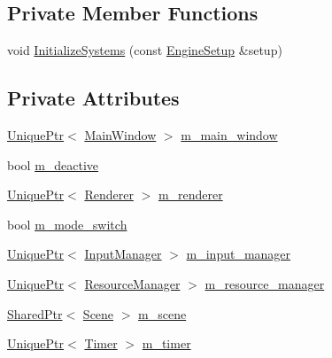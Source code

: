 \subsection*{Private Member Functions}
\begin{DoxyCompactItemize}
\item 
void \hyperlink{classmage_1_1_engine_a29a47448fb182b110d46d287a72b8b4e}{Initialize\+Systems} (const \hyperlink{structmage_1_1_engine_setup}{Engine\+Setup} \&setup)
\end{DoxyCompactItemize}
\subsection*{Private Attributes}
\begin{DoxyCompactItemize}
\item 
\hyperlink{namespacemage_a8c307fbcc33bce9b7f2aa4c26c3b95cf}{Unique\+Ptr}$<$ \hyperlink{classmage_1_1_main_window}{Main\+Window} $>$ \hyperlink{classmage_1_1_engine_a3aea7e8c0c1247cac570334a3d3543d6}{m\+\_\+main\+\_\+window}
\item 
bool \hyperlink{classmage_1_1_engine_ab8a4b0157403708ae7d1d018a95b4c63}{m\+\_\+deactive}
\item 
\hyperlink{namespacemage_a8c307fbcc33bce9b7f2aa4c26c3b95cf}{Unique\+Ptr}$<$ \hyperlink{classmage_1_1_renderer}{Renderer} $>$ \hyperlink{classmage_1_1_engine_a1248b7c21bc8256c72d372c12ed1ee68}{m\+\_\+renderer}
\item 
bool \hyperlink{classmage_1_1_engine_aa5cb2e0b7bb2c4a9020e79ab832ee221}{m\+\_\+mode\+\_\+switch}
\item 
\hyperlink{namespacemage_a8c307fbcc33bce9b7f2aa4c26c3b95cf}{Unique\+Ptr}$<$ \hyperlink{classmage_1_1_input_manager}{Input\+Manager} $>$ \hyperlink{classmage_1_1_engine_a8e9048208a6a5c5b034aaa1cbdab28bc}{m\+\_\+input\+\_\+manager}
\item 
\hyperlink{namespacemage_a8c307fbcc33bce9b7f2aa4c26c3b95cf}{Unique\+Ptr}$<$ \hyperlink{classmage_1_1_resource_manager}{Resource\+Manager} $>$ \hyperlink{classmage_1_1_engine_ac8d94579e72983a99a78be6b9b606a28}{m\+\_\+resource\+\_\+manager}
\item 
\hyperlink{namespacemage_a1e01ae66713838a7a67d30e44c67703e}{Shared\+Ptr}$<$ \hyperlink{classmage_1_1_scene}{Scene} $>$ \hyperlink{classmage_1_1_engine_a82158ab9c1b60538ef8c46d5eb263bb8}{m\+\_\+scene}
\item 
\hyperlink{namespacemage_a8c307fbcc33bce9b7f2aa4c26c3b95cf}{Unique\+Ptr}$<$ \hyperlink{classmage_1_1_timer}{Timer} $>$ \hyperlink{classmage_1_1_engine_a4daac998928a6c087b310c52b3f26ae4}{m\+\_\+timer}
\end{DoxyCompactItemize}
